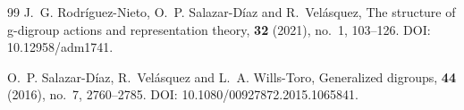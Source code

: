 \documentclass[11pt]{article}
\theoremstyle{plain}
\theoremstyle{definition}
\theoremstyle{remark}
\begin{document}
\begin{thebibliography}{99}
		J.~G. Rodr\'iguez-Nieto, O.~P. Salazar-D\'iaz and R.~Vel\'asquez,
		\newblock The structure of g-digroup actions and representation theory,
		 \textbf{32} (2021), no.~1, 103--126.
		\newblock DOI: 10.12958/adm1741.
		
		O.~P. Salazar-D\'iaz, R.~Vel\'asquez and L.~A. Wills-Toro,
		\newblock Generalized digroups,
		 \textbf{44} (2016), no.~7, 2760--2785.
		\newblock DOI: 10.1080/00927872.2015.1065841.
		
	\end{thebibliography}
	
\end{document}

